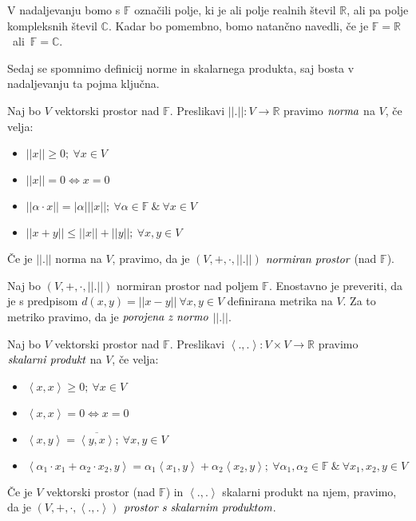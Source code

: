 \documentclass[mat2]{matdelo}
\newcommand{\R}{\mathbb{R}}
\newcommand{\F}{\mathbb{F}}
\newcommand{\C}{\mathbb{C}}
\newcommand{\abs}[1]{\ensuremath{\lvert #1 \rvert}}
\newcommand{\norm}[1]{\abs{\abs{#1}}}
\newcommand{\pojem}[1]{\ensuremath{\emph{#1}}}
\newcommand{\Sp}[2]{\ensuremath{\left<#1, #2\right>}}
\newcommand{\map}[3]{\ensuremath{{#1}:{#2}\rightarrow{#3}}}
\begin{document}
		\begin{opomba}
			\label{op:Polj}
			V nadaljevanju bomo s $\F$ označili polje, ki je ali polje realnih števil $\R$, ali pa polje kompleksnih števil $\C$. Kadar bo pomembno, bomo natančno navedli, če je $\F = \R$~ali~$\F = \C$.
		\end{opomba}
		Sedaj se spomnimo definicij norme in skalarnega produkta, saj bosta v nadaljevanju ta pojma ključna.
		\begin{definicija}
			\label{def:Norm}
			Naj bo $V$ vektorski prostor nad $\F$. Preslikavi $\map{\norm{.}}{V}{\R}$ pravimo \pojem{norma} na $V$, če velja: \begin{itemize}
				\item $\norm{x} \geq 0;~\forall x\in V$
				\item $\norm{x} = 0 \iff x = 0$
				\item $\norm{\alpha\cdot x} = \abs{\alpha}\norm{x};~\forall \alpha\in\F~\&~\forall x\in V$
				\item $\norm{x+y} \leq \norm{x}+\norm{y};~\forall x, y\in V$
			\end{itemize}
			Če je $\norm{.}$ norma na $V$, pravimo, da je $(V, +, \cdot, \norm{.})$ \pojem{normiran prostor} (nad $\F$).
		\end{definicija}
		\begin{opomba}
			\label{op:Norm}
			Naj bo $(V, +, \cdot, \norm{.})$ normiran prostor nad poljem $\F$. Enostavno je preveriti, da je s predpisom $d(x, y) = \norm{x - y} ~\forall x, y \in V$ definirana metrika na $V$. Za to metriko pravimo, da je \pojem{porojena z normo} $\norm{.}$.
		\end{opomba}
		\begin{definicija}
			\label{def:ScalProd}
			Naj bo $V$ vektorski prostor nad $\F$. Preslikavi $\map{\Sp{.}{.}}{V\times V}{\R}$ pravimo \pojem{skalarni produkt} na $V$, če velja: \begin{itemize}
				\item $\Sp{x}{x} \geq 0;~\forall x\in V$
				\item $\Sp{x}{x} = 0 \iff x = 0$
				\item $\Sp{x}{y} = \overline{\Sp{y}{x}};~\forall x, y\in V$
				\item $\Sp{\alpha_1\cdot x_1 + \alpha_2\cdot x_2}{y} = \alpha_1\Sp{x_1}{y} +\alpha_2\Sp{x_2}{y};~\forall \alpha_1, \alpha_2\in\F~\&~\forall x_1, x_2, y\in V$
			\end{itemize}
			Če je $V$ vektorski prostor (nad $\F$) in $\Sp{.}{.}$ skalarni produkt na njem, pravimo, da je $(V, +, \cdot, \Sp{.}{.})$ \pojem{prostor s skalarnim produktom}.
		\end{definicija}
\end{document}
